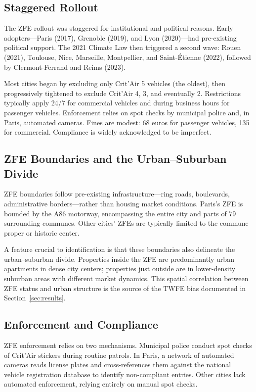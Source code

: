 \documentclass[12pt]{article}
\begin{document}
\subsection{Staggered Rollout}

The ZFE rollout was staggered for institutional and political reasons. Early adopters---Paris (2017), Grenoble (2019), and Lyon (2020)---had pre-existing political support. The 2021 Climate Law then triggered a second wave: Rouen (2021), Toulouse, Nice, Marseille, Montpellier, and Saint-\'Etienne (2022), followed by Clermont-Ferrand and Reims (2023).

Most cities began by excluding only Crit'Air 5 vehicles (the oldest), then progressively tightened to exclude Crit'Air 4, 3, and eventually 2. Restrictions typically apply 24/7 for commercial vehicles and during business hours for passenger vehicles. Enforcement relies on spot checks by municipal police and, in Paris, automated cameras. Fines are modest: 68 euros for passenger vehicles, 135 for commercial. Compliance is widely acknowledged to be imperfect.

\subsection{ZFE Boundaries and the Urban--Suburban Divide}

ZFE boundaries follow pre-existing infrastructure---ring roads, boulevards, administrative borders---rather than housing market conditions. Paris's ZFE is bounded by the A86 motorway, encompassing the entire city and parts of 79 surrounding communes. Other cities' ZFEs are typically limited to the commune proper or historic center.

A feature crucial to identification is that these boundaries also delineate the urban--suburban divide. Properties inside the ZFE are predominantly urban apartments in dense city centers; properties just outside are in lower-density suburban areas with different market dynamics. This spatial correlation between ZFE status and urban structure is the source of the TWFE bias documented in Section~\ref{sec:results}.

\subsection{Enforcement and Compliance}

ZFE enforcement relies on two mechanisms. Municipal police conduct spot checks of Crit'Air stickers during routine patrols. In Paris, a network of automated cameras reads license plates and cross-references them against the national vehicle registration database to identify non-compliant entries. Other cities lack automated enforcement, relying entirely on manual spot checks.
\end{document}
